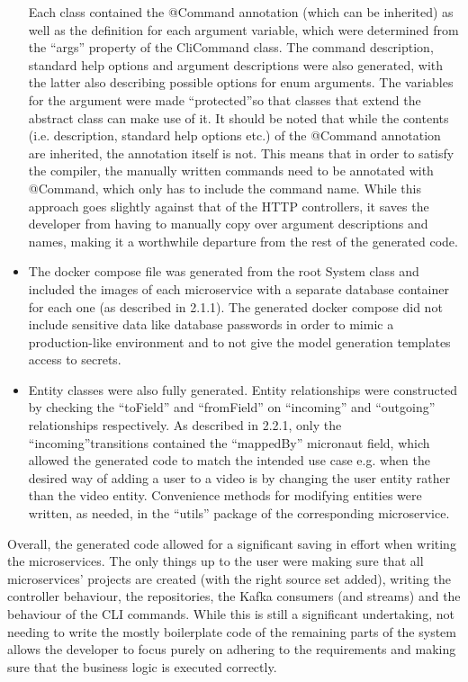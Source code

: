 \documentclass[parskip=full]{article}
\begin{document}
\begin{itemize}
        Each class contained the @Command annotation (which can be inherited) as well as the definition for each argument variable, which were determined from the  ``args'' property of the CliCommand class.
        The command description, standard help options and argument descriptions were also generated, with the latter also describing possible options for enum arguments.
        The variables for the argument were made ``protected''so that classes that extend the abstract class can make use of it.
        It should be noted that while the contents (i.e. description, standard help options etc.) of the @Command annotation are inherited, the annotation itself is not.
        This means that in order to satisfy the compiler, the manually written commands need to be annotated with @Command, which only has to include the command name.
        While this approach goes slightly against that of the HTTP controllers, it saves the developer from having to manually copy over argument descriptions and names, making it a worthwhile departure from the rest of the generated code.
        \item	The docker compose file was generated from the root System class and included the images of each microservice with a separate database container for each one (as described in 2.1.1).
        The generated docker compose did not include sensitive data like database passwords in order to mimic a production-like environment and to not give the model generation templates access to secrets.
        \item	Entity classes were also fully generated.
        Entity relationships were constructed by checking the  ``toField'' and  ``fromField'' on  ``incoming'' and  ``outgoing'' relationships respectively.
        As described in 2.2.1, only the ``incoming''transitions contained the  ``mappedBy'' micronaut field, which allowed the generated code to match the intended use case e.g. when the desired way of adding a user to a video is by changing the user entity rather than the video entity.
        Convenience methods for modifying entities were written, as needed, in the  ``utils'' package of the corresponding microservice.
    \end{itemize}

    Overall, the generated code allowed for a significant saving in effort when writing the microservices.
    The only things up to the user were making sure that all microservices' projects are created (with the right source set added), writing the controller behaviour, the repositories, the Kafka consumers (and streams) and the behaviour of the CLI commands.
    While this is still a significant undertaking, not needing to write the mostly boilerplate code of the remaining parts of the system allows the developer to focus purely on adhering to the requirements and making sure that the business logic is executed correctly.

    \pagebreak
    
    
\end{document}
